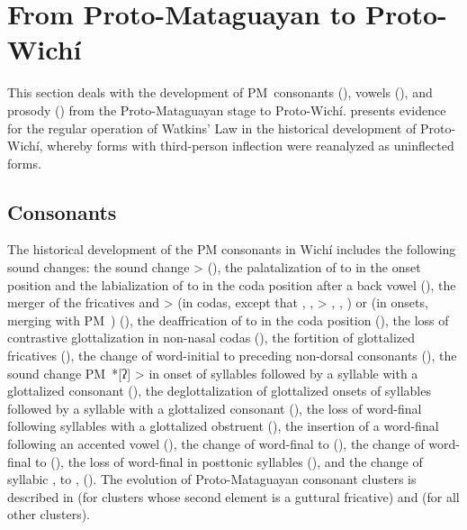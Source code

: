 \section{From Proto-Mataguayan to Proto-Wichí} \label{pm-to-wi}

This section deals with the development of PM~consonants (), vowels (), and prosody () from the Proto-Mataguayan stage to Proto-Wichí.  presents evidence for the regular operation of Watkins' Law in the historical development of Proto-Wichí, whereby forms with third-person inflection were reanalyzed as uninflected forms.

\subsection{Consonants} \label{wi-cons}

The historical development of the PM consonants in Wichí includes the following sound changes: the sound change  >  (), the palatalization of  to  in the onset position and the labialization of  to  in the coda position after a back vowel (), the merger of the fricatives  and  >  (in codas, except that , ,  > , , ) or  (in onsets, merging with PM~) (), the deaffrication of  to  in the coda position (), the loss of contrastive glottalization in non-nasal codas (), the fortition of glottalized fricatives (), the change of word-initial  to  preceding non-dorsal consonants (), the sound change PM~*[ʔ] >  in onset of syllables followed by a syllable with a glottalized consonant (), the deglottalization of glottalized onsets of syllables followed by a syllable with a glottalized consonant (), the loss of word-final  following syllables with a glottalized obstruent (), the insertion of a word-final  following an accented vowel (), the change of word-final  to  (), the change of word-final  to  (), the loss of word-final  in posttonic syllables (), and the change of syllabic ,  to ,  (). The evolution of Proto-Mataguayan consonant clusters is described in  (for clusters whose second element is a guttural fricative) and  (for all other clusters).

